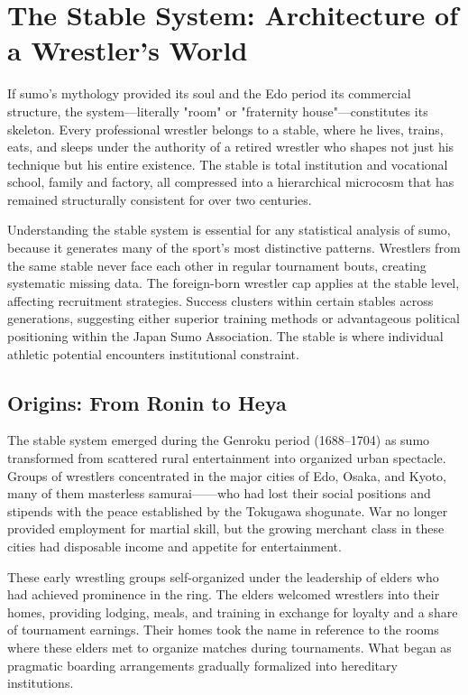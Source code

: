 \section[The Stable System]{The Stable System: Architecture of a Wrestler's World}

If sumo's mythology provided its soul and the Edo period its commercial structure, the  system—literally "room" or "fraternity house"—constitutes its skeleton. Every professional wrestler belongs to a stable, where he lives, trains, eats, and sleeps under the authority of a retired wrestler who shapes not just his technique but his entire existence. The stable is total institution and vocational school, family and factory, all compressed into a hierarchical microcosm that has remained structurally consistent for over two centuries.

Understanding the stable system is essential for any statistical analysis of sumo, because it generates many of the sport's most distinctive patterns. Wrestlers from the same stable never face each other in regular tournament bouts, creating systematic missing data. The foreign-born wrestler cap applies at the stable level, affecting recruitment strategies. Success clusters within certain stables across generations, suggesting either superior training methods or advantageous political positioning within the Japan Sumo Association. The stable is where individual athletic potential encounters institutional constraint.

\subsection{Origins: From Ronin to Heya}

The stable system emerged during the Genroku period (1688--1704) as sumo transformed from scattered rural entertainment into organized urban spectacle. Groups of wrestlers concentrated in the major cities of Edo, Osaka, and Kyoto, many of them masterless samurai——who had lost their social positions and stipends with the peace established by the Tokugawa shogunate. War no longer provided employment for martial skill, but the growing merchant class in these cities had disposable income and appetite for entertainment.

These early wrestling groups self-organized under the leadership of elders who had achieved prominence in the ring. The elders welcomed wrestlers into their homes, providing lodging, meals, and training in exchange for loyalty and a share of tournament earnings. Their homes took the name  in reference to the rooms where these elders met to organize matches during tournaments. What began as pragmatic boarding arrangements gradually formalized into hereditary institutions.

